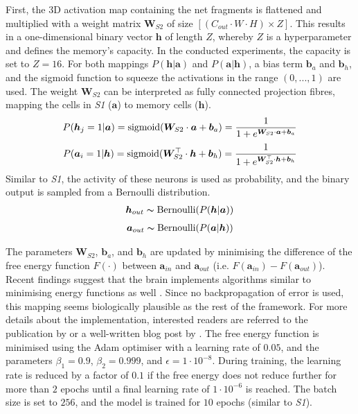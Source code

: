 First, the 3D activation map containing the net fragments is flattened and multiplied with a weight matrix $\boldsymbol{W}_{S2}$ of size $\left[(C_{out}\cdot W\cdot H) \times Z\right]$. This results in a one-dimensional binary vector $\boldsymbol{h}$ of length $Z$, whereby $Z$ is a hyperparameter and defines the memory's capacity.
In the conducted experiments, the capacity is set to $Z=16$.
For both mappings $P(\boldsymbol{h}|\boldsymbol{a})$ and $P(\boldsymbol{a}|\boldsymbol{h})$, a bias term $\boldsymbol{b}_a$ and $\boldsymbol{b}_h$, and the sigmoid function to squeeze the activations in the range $(0, ..., 1)$ are used. 
The weight $\boldsymbol{W}_{S2}$ can be interpreted as fully connected projection fibres, mapping the cells in \emph{S1} ($\boldsymbol{a}$) to memory cells ($\boldsymbol{h}$).
\begin{align}\eqlbl{l2_1}
	P(\boldsymbol{h}_j=1 | \boldsymbol{a}) = \text{sigmoid}(\boldsymbol{W}_{S2} \cdot \boldsymbol{a} + \boldsymbol{b}_a) = \frac{1}{1 + e^{\boldsymbol{W}_{S2} \cdot \boldsymbol{a} + \boldsymbol{b}_a}}
\end{align}
\begin{align}\eqlbl{l2_2}
	P(\boldsymbol{a}_i=1 | \boldsymbol{h}) = \text{sigmoid}(\boldsymbol{W}_{S2}^\top \cdot \boldsymbol{h} + \boldsymbol{b}_h) = \frac{1}{1 + e^{\boldsymbol{W}_{S2}^\top \cdot \boldsymbol{h} + \boldsymbol{b}_h}}
\end{align}
Similar to \emph{S1}, the activity of these neurons is used as probability, and the binary output is sampled from a Bernoulli distribution.
\begin{align}\eqlbl{l2_3}
	\boldsymbol{h}_{out} \thicksim \text{Bernoulli}(P(\boldsymbol{h} | \boldsymbol{a}) )
\end{align}
\begin{align}\eqlbl{l2_4}
	\boldsymbol{a}_{out} \thicksim \text{Bernoulli}(P(\boldsymbol{a} | \boldsymbol{h}))
\end{align}

The parameters $\boldsymbol{W}_{S2}$, $\boldsymbol{b}_a$, and $\boldsymbol{b}_h$ are updated by minimising the difference of the free energy function $F(\cdot)$  between $\boldsymbol{a}_{in}$ and $\boldsymbol{a}_{out}$ (i.e. $F(\boldsymbol{a}_{in}) - F(\boldsymbol{a}_{out})$). Recent findings suggest that the brain implements algorithms similar to minimising energy functions as well . Since no backpropagation of error is used, this mapping seems biologically plausible as the rest of the framework. For more details about the implementation, interested readers are referred to the publication by  or a well-written blog post by .
The free energy function is minimised using the Adam  optimiser with a learning rate of $0.05$, and the parameters $\beta_1=0.9$, $\beta_2=0.999$, and $\epsilon=1\cdot 10^{-8}$.
During training, the learning rate is reduced by a factor of $0.1$ if the free energy does not reduce further for more than $2$ epochs until a final learning rate of $1\cdot 10^{-6}$ is reached.
The batch size is set to $256$, and the model is trained for $10$ epochs (similar to \emph{S1}).

